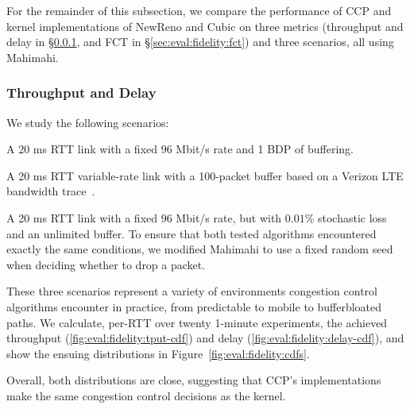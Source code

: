 For the remainder of this subsection, we compare the performance of CCP and kernel implementations of NewReno and Cubic on three metrics (throughput and delay in \S\ref{sec:eval:fidelity:tput-delay}, and FCT in \S\ref{sec:eval:fidelity:fct}) and three scenarios, all using Mahimahi.

\subsubsection{Throughput and Delay}
\label{sec:eval:fidelity:tput-delay}

We study the following scenarios:

 A 20 ms RTT link with a fixed $96$ Mbit/s rate and 1 BDP of buffering.

 A 20 ms RTT variable-rate link with a 100-packet buffer based on a Verizon LTE bandwidth trace~\cite{mahimahi}.

 A 20 ms RTT link with a fixed $96$ Mbit/s rate, but with $0.01$\% stochastic loss and an unlimited buffer. To ensure that both tested algorithms encountered exactly the same conditions, we modified Mahimahi to use a fixed random seed when deciding whether to drop a packet.

These three scenarios represent a variety of environments congestion control algorithms encounter in practice, from predictable to mobile to bufferbloated paths. We calculate, per-RTT over twenty 1-minute experiments, the achieved throughput (\ref{fig:eval:fidelity:tput-cdf}) and delay (\ref{fig:eval:fidelity:delay-cdf}), and show the ensuing distributions in Figure~\ref{fig:eval:fidelity:cdfs}.

Overall, both distributions are close, suggesting that CCP's implementations make the same congestion control decisions as the kernel.

